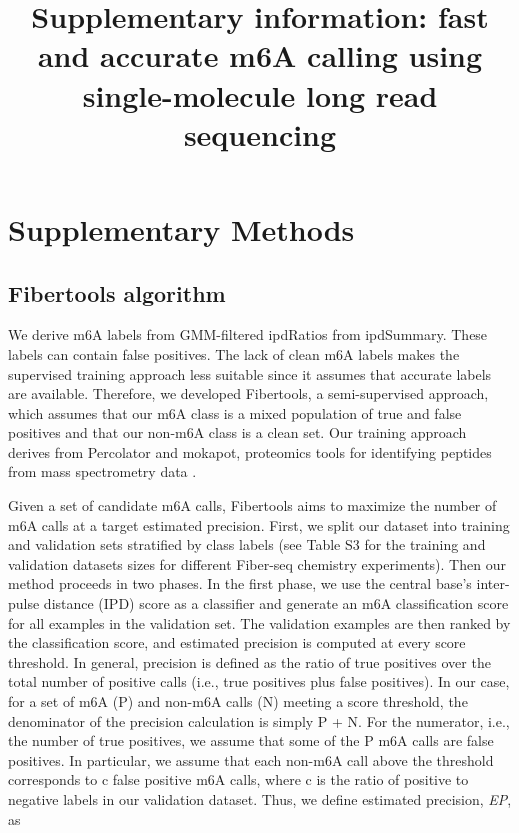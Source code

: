 \documentclass{article}
\date{}
\title{Supplementary information: fast and accurate m6A calling using single-molecule long read sequencing}
\begin{document}
\maketitle

\section{Supplementary Methods}
\subsection{Fibertools algorithm}
We derive m6A labels from GMM-filtered ipdRatios from ipdSummary. These labels can contain false positives. The lack of clean m6A labels makes the supervised training approach less suitable since it assumes that accurate labels are available. Therefore, we developed Fibertools, a semi-supervised approach, which assumes that our m6A class is a mixed population of true and false positives and that our non-m6A class is a clean set. Our training approach derives from Percolator and mokapot, proteomics tools for identifying peptides from mass spectrometry data \cite{fondrie2021mokapot,kall2007semi}.  

Given a set of candidate m6A calls, Fibertools aims to maximize the number of m6A calls at a target estimated precision. First, we split our dataset into training and validation sets stratified by class labels (see Table S3 for the training and validation datasets sizes for different Fiber-seq chemistry experiments). Then our method proceeds in two phases. In the first phase, we use the central base's inter-pulse distance (IPD) score as a classifier and generate an m6A classification score for all examples in the validation set. The validation examples are then ranked by the classification score, and estimated precision is computed at every score threshold.  In general, precision is defined as the ratio of true positives over the total number of positive calls (i.e., true positives plus false positives). In our case, for a set of m6A (P) and non-m6A calls (N) meeting a score threshold, the denominator of the precision calculation is simply P + N. For the numerator, i.e., the number of true positives, we assume that some of the P m6A calls are false positives. In particular, we assume that each non-m6A call above the threshold corresponds to c false positive m6A calls, where c is the ratio of positive to negative labels in our validation dataset. Thus, we define estimated precision, \textit{EP}, as
\end{document}
